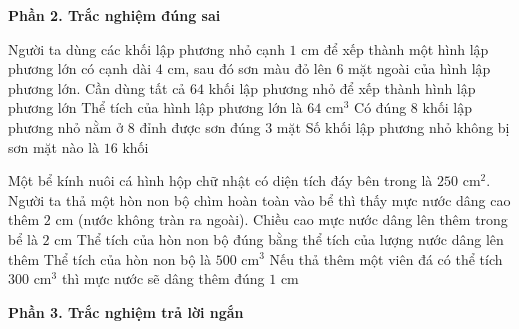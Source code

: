\textbf{Phần 2. Trắc nghiệm đúng sai}

\begin{ex} %
Người ta dùng các khối lập phương nhỏ cạnh $1\text{ cm}$ để xếp thành một hình lập phương lớn có cạnh dài $4\text{ cm}$, sau đó sơn màu đỏ lên 6 mặt ngoài của hình lập phương lớn.
\choiceTF
{\True Cần dùng tất cả $64$ khối lập phương nhỏ để xếp thành hình lập phương lớn}
{\True Thể tích của hình lập phương lớn là $64\text{ cm}^3$}
{\True Có đúng $8$ khối lập phương nhỏ nằm ở $8$ đỉnh được sơn đúng $3$ mặt}
{Số khối lập phương nhỏ không bị sơn mặt nào là $16$ khối}
\end{ex}

\begin{ex} %
Một bể kính nuôi cá hình hộp chữ nhật có diện tích đáy bên trong là $250\text{ cm}^2$. Người ta thả một hòn non bộ chìm hoàn toàn vào bể thì thấy mực nước dâng cao thêm $2\text{ cm}$ (nước không tràn ra ngoài).
\choiceTF
{\True Chiều cao mực nước dâng lên thêm trong bể là $2\text{ cm}$}
{\True Thể tích của hòn non bộ đúng bằng thể tích của lượng nước dâng lên thêm}
{\True Thể tích của hòn non bộ là $500\text{ cm}^3$}
{Nếu thả thêm một viên đá có thể tích $300\text{ cm}^3$ thì mực nước sẽ dâng thêm đúng $1\text{ cm}$}
\end{ex}

\textbf{Phần 3. Trắc nghiệm trả lời ngắn}

